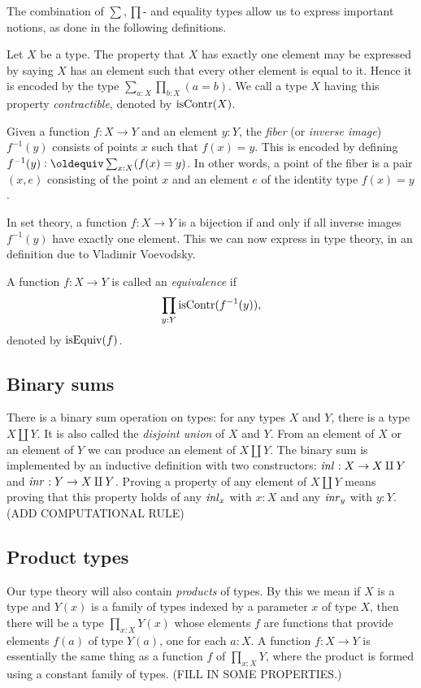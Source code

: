 The combination of $\sum,\prod$- and equality types allow
us to express important notions, as done in the following
definitions.

\begin{definition}
\label{def:contractible}
Let $X$ be a type.  The property that $X$ has exactly one element may be expressed by saying $X$ has an element such that every other element is
equal to it.  Hence it is encoded by the type $\sum_{a:X} \prod_{b:X} (a=b)$.
We call a type $X$ having this property \emph{contractible}, denoted by $\mathrm{isContr}(X)$.
\end{definition}

\begin{definition}
\label{def:fiber}
Given a function $f : X \to Y$ and an element $y:Y$, the \emph{fiber} (or \emph{inverse image}) $f^{-1}(y)$ consists of points $x$ such that $f(x)
= y$.  This is encoded by defining $f^{-1}(y) \defeq \sum_{x:X} (f(x) = y)$.  In other words, a point of the fiber is a pair $(x,e)$ consisting
of the point $x$ and an element $e$ of the identity type $f(x) = y$.
\end{definition}

In set theory, a function $f : X \to Y$ is a bijection if and only if
all inverse images $f^{-1}(y)$ have exactly one element.
This we can now express in type theory, in an definition due
to Vladimir Voevodsky. 

\begin{definition}
\label{def:equivalence}
A function $f : X \to Y$ is called an \emph{equivalence} if
\[
\prod_{y:Y} \mathrm{isContr}(f^{-1}(y)),
\]
denoted by $\mathrm{isEquiv}(f)$.
\end{definition}

\subsection{Binary sums}
\label{sec:binsum-types}
There is a binary sum operation on types: for any types $X$ and $Y$, there is a type $X \amalg Y$.  It is also called the \emph{disjoint union}
of $X$ and $Y$.  From an element of $X$ or an element of $Y$ we can produce an element of $X \amalg Y$.  The binary sum is implemented by an
inductive definition with two constructors: $\mathop{{\it inl}_{}} : X \to X \amalg Y$ and
$\mathop{{\it inr}_{}} : Y \to X \amalg Y$. Proving a property of any element of $X \amalg Y$
means proving that this property holds of any $\mathop{{\it inl}_{x}}$ with $x:X$ and any
$\mathop{{\it inr}_{y}}$ with $y:Y$. (ADD COMPUTATIONAL RULE)

\subsection{Product types}
\label{sec:product-types}
Our type theory will also contain \emph{products} of types.  By this we mean if $X$ is a type and $Y(x)$ is a family of types indexed by a
parameter $x$ of type $X$, then there will be a type $\prod _{x:X} Y(x)$ whose elements $f$ are functions that provide elements $f(a)$ of type
$Y(a)$, one for each $a:X$.  A function $f : X \to Y$ is essentially the same thing as a function $f$ of $\prod_{x:X} Y$, where the product is
formed using a constant family of types.  (FILL IN SOME PROPERTIES.)

